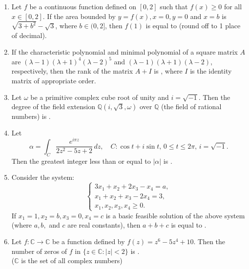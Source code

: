 \documentclass[journal]{IEEEtran}
\numberwithin{equation}{enumi}
\numberwithin{figure}{enumi}
\begin{document}
\begin{enumerate}
\bigskip


\item Let $f$ be a continuous function defined on $[0,2]$ such that $f(x) \geq 0$ for all $x \in [0,2]$. If the area bounded by $y = f(x), x = 0, y = 0$ and $x = b$ is $\sqrt{3 + b^2} - \sqrt{3}$, where $b \in (0,2]$, then $f(1)$ is equal to \underline{\hspace{1cm}} (round off to 1 place of decimal).
\bigskip

\item If the characteristic polynomial and minimal polynomial of a square matrix $A$ are $(\lambda - 1)(\lambda + 1)^4(\lambda - 2)^5$ and $(\lambda - 1)(\lambda + 1)(\lambda - 2)$, respectively, then the rank of the matrix $A + I$ is \underline{\hspace{1cm}}, where $I$ is the identity matrix of appropriate order.
\bigskip

\item Let $\omega$ be a primitive complex cube root of unity and $i = \sqrt{-1}$. Then the degree of the field extension $\mathbb{Q}\left(i, \sqrt{3}, \omega\right)$ over $\mathbb{Q}$ (the field of rational numbers) is \underline{\hspace{1cm}}.
\bigskip

\item Let
\[
\alpha = \int_C \frac{e^{i \pi z}}{2z^2 - 5z + 2} \, dz, \quad C : \cos t + i \sin t, \, 0 \leq t \leq 2\pi, \, i = \sqrt{-1}.
\]
Then the greatest integer less than or equal to $|\alpha|$ is \underline{\hspace{1cm}}.
\bigskip

\item Consider the system:
\[
\begin{cases}
3x_1 + x_2 + 2x_3 - x_4 = a, \\
x_1 + x_2 + x_3 - 2x_4 = 3, \\
x_1, x_2, x_3, x_4 \geq 0.
\end{cases}
\]
If $x_1 = 1, x_2 = b, x_3 = 0, x_4 = c$ is a basic feasible solution of the above system (where $a, b,$ and $c$ are real constants), then $a + b + c$ is equal to \underline{\hspace{1cm}}.
\bigskip

\item Let $f : \mathbb{C} \to \mathbb{C}$ be a function defined by $f(z) = z^6 - 5z^4 + 10$. Then the number of zeros of $f$ in $\{z \in \mathbb{C} : |z| < 2\}$ is \underline{\hspace{1cm}}. \\
($\mathbb{C}$ is the set of all complex numbers)
\bigskip


\end{enumerate}
\end{document}
